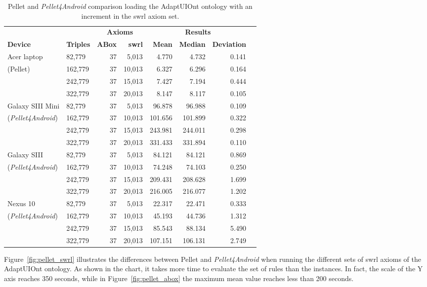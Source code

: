 \begin{table}
 \caption{Pellet and \textit{Pellet4Android} comparison loading the AdaptUIOnt 
ontology with an increment in the \ac{swrl} axiom set.}
 \label{tbl:eval_swrl}
 \footnotesize
 \centering
  \begin{tabular}{l l r r r r r r}
  \hline 
  &  & \multicolumn{2}{c}{\textbf{Axioms}} & 
  \multicolumn{3}{c}{\textbf{Results}}	\\
  \textbf{Device} & \textbf{Triples}& \textbf{ABox} & \textbf{\ac{swrl}}
  & \textbf{Mean} & \textbf{Median} & \textbf{Deviation}	\\
  \hline 
  Acer laptop & 82,779  & 37 & 5,013  & 4.770 & 4.732 & 0.141	\\
  (Pellet)    & 162,779 & 37 & 10,013 & 6.327 & 6.296 & 0.164 	\\
	      & 242,779	& 37 & 15,013 & 7.427 & 7.194 & 0.444 	\\
	      & 322,779	& 37 & 20,013 & 8.147 & 8.117 & 0.105	\\
  \hline
 Galaxy SIII Mini& 82,779 & 37 & 5,013  & 96.878  & 96.988  & 0.109 \\
(\textit{Pellet4Android}) & 162,779& 37 & 10,013 & 101.656 & 101.899 & 0.322 \\
	      & 242,779	& 37 & 15,013 & 243.981	& 244.011 & 0.298 \\
	      & 322,779	& 37 & 20,013 & 331.433	& 331.894 & 0.110 \\	
	\hline      
  Galaxy SIII & 82,779	& 37 & 5,013 & 84.121 & 84.121 & 0.869	\\
(\textit{Pellet4Android})& 162,779 & 37	& 10,013 & 74.248 & 74.103 & 0.250\\
		& 242,779 & 37 & 15,013	& 209.431 & 208.628 & 1.699 \\
		& 322,779 & 37 & 20,013	& 216.005 & 216.077 & 1.202 \\
\hline
  Nexus 10	& 82,779 & 37 & 5,013 & 22.317 & 22.471	& 0.333 \\
(\textit{Pellet4Android})& 162,779& 37 & 10,013& 45.193 & 44.736 & 1.312 \\
		& 242,779& 37 & 15,013& 85.543 & 88.134 & 5.490	\\
		& 322,779& 37 & 20,013& 107.151& 106.131& 2.749	\\
  \hline
\end{tabular}
\end{table}

Figure~\ref{fig:pellet_swrl} illustrates the differences between Pellet and
\textit{Pellet4Android} when running the different sets of \ac{swrl} axioms of the 
AdaptUIOnt ontology. As shown in the chart, it takes more time to evaluate the 
set of rules than the instances. In fact, the scale of the Y axis reaches 350 
seconds, while in Figure~\ref{fig:pellet_abox} the maximum mean value reaches 
less than 200 seconds.

